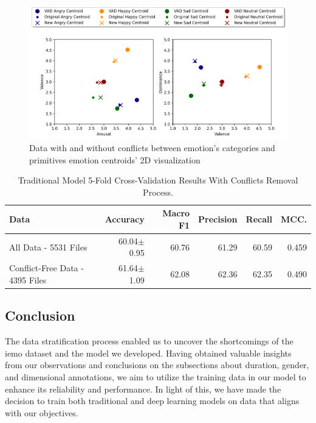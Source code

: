 \begin{figure}[H]
  \centering
  \includegraphics[width=.9\linewidth]{figs/5_data_stratification/strict_conflicts_centroids_2d.png}
  \caption{Data with and without conflicts between emotion's categories and primitives emotion centroids' 2D visualization}
  \label{fig:2dplane2}
\end{figure}



\begin{table}[H]
	\small
	\centering
	\caption{Traditional Model 5-Fold Cross-Validation Results With Conflicts Removal Process.}
	\label{tab:emo_cat2}
	\centering
	\begin{tabular}{lrrrrr}
		\toprule
		Data   						 	& Accuracy    & Macro F1    & Precision   & Recall      & MCC.       \\
		\midrule
		All Data - 5531 Files		 	& 60.04$\pm$0.95 & 60.76 & 61.29 & 60.59 & 0.459 \\
		Conflict-Free Data - 4395 Files & 61.64$\pm$1.09 & 62.08 & 62.36 & 62.35 & 0.490 \\
		\bottomrule
	\end{tabular}
\end{table}


\subsection{Conclusion}

The data stratification process enabled us to uncover the shortcomings of the \ac{iemo} dataset and the model we developed. Having obtained valuable insights from our observations and conclusions on the subsections about duration, gender, and dimensional annotations, we aim to utilize the training data in our model to enhance its reliability and performance. In light of this, we have made the decision to train both traditional and deep learning models on data that aligns with our objectives.


